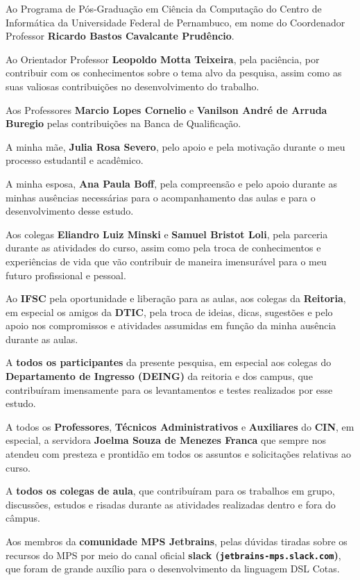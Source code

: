 \begin{agradecimentos}
Ao Programa de Pós-Graduação em Ciência da Computação do Centro de Informática da Universidade Federal de Pernambuco, em nome do Coordenador Professor \textbf{Ricardo Bastos Cavalcante Prudêncio}.

Ao Orientador Professor \textbf{Leopoldo Motta Teixeira}, pela paciência, por contribuir com os conhecimentos sobre o tema alvo da pesquisa, assim como as suas valiosas contribuições no desenvolvimento do trabalho.

Aos Professores \textbf{Marcio Lopes Cornelio} e \textbf{Vanilson André de Arruda Buregio} pelas contribuições na Banca de Qualificação.

A minha mãe, \textbf{Julia Rosa Severo}, pelo apoio e pela motivação durante o meu processo estudantil e acadêmico.

A minha esposa, \textbf{Ana Paula Boff}, pela compreensão e pelo apoio durante as minhas ausências necessárias para o acompanhamento das aulas e para o desenvolvimento desse estudo.

Aos colegas \textbf{Eliandro Luiz Minski} e \textbf{Samuel Bristot Loli}, pela parceria durante as atividades do curso, assim como pela troca de conhecimentos e experiências de vida que vão contribuir de maneira imensurável para o meu futuro profissional e pessoal.

Ao \textbf{IFSC} pela oportunidade e liberação para as aulas, aos colegas da \textbf{Reitoria}, em especial os amigos da \textbf{DTIC}, pela troca de ideias, dicas, sugestões e pelo apoio nos compromissos e atividades assumidas em função da minha ausência durante as aulas.

A \textbf{todos os participantes} da presente pesquisa, em especial aos colegas do \textbf{Departamento de Ingresso (DEING)} da reitoria e dos campus, que contribuíram imensamente para os levantamentos e testes realizados por esse estudo.

A todos os \textbf{Professores}, \textbf{Técnicos Administrativos} e \textbf{Auxiliares} do \textbf{CIN}, em especial, a servidora \textbf{Joelma Souza de Menezes Franca} que sempre nos atendeu com presteza e prontidão em todos os assuntos e solicitações relativas ao curso.

A \textbf{todos os colegas de aula}, que contribuíram para os trabalhos em grupo, discussões, estudos e risadas durante as atividades realizadas dentro e fora do câmpus. 

Aos membros da \textbf{comunidade MPS Jetbrains}, pelas dúvidas tiradas sobre os recursos do MPS por meio do canal oficial \textbf{slack (\texttt{jetbrains-mps.slack.com})}, que foram de grande auxílio para o desenvolvimento da linguagem DSL Cotas.



\end{agradecimentos}
